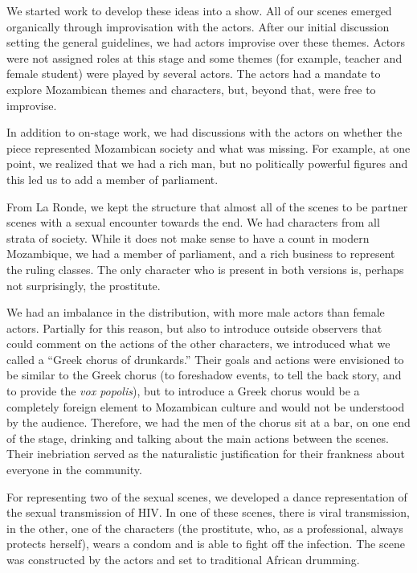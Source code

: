 \documentclass[article,twocolumn,twoside]{memoir}
\begin{document}
We started work to develop these ideas into a show. All of our scenes emerged
organically through improvisation with the actors. After our initial discussion
setting the general guidelines, we had actors improvise over these themes.
Actors were not assigned roles at this stage and some themes (for example,
teacher and female student) were played by several actors. The actors had a
mandate to explore Mozambican themes and characters, but, beyond that, were
free to improvise.

In addition to on-stage work, we had discussions with the actors on whether the
piece represented Mozambican society and what was missing. For example, at one
point, we realized that we had a rich man, but no politically powerful figures
and this led us to add a member of parliament.

From La Ronde, we kept the structure that almost all of the scenes to be
partner scenes with a sexual encounter towards the end. We had characters from
all strata of society. While it does not make sense to have a count in modern
Mozambique, we had a member of parliament, and a rich business to represent the
ruling classes. The only character who is present in both versions is, perhaps
not surprisingly, the prostitute.

We had an imbalance in the distribution, with more male actors than female
actors. Partially for this reason, but also to introduce outside observers that
could comment on the actions of the other characters, we introduced what we
called a ``Greek chorus of drunkards.'' Their goals and actions were envisioned
to be similar to the Greek chorus (to foreshadow events, to tell the back story,
and to provide the \textit{vox popolis}), but to introduce a Greek chorus would
be a completely foreign element to Mozambican culture and would not be
understood by the audience. Therefore, we had the men of the chorus sit at a
bar, on one end of the stage, drinking and talking about the main actions
between the scenes. Their inebriation served as the naturalistic justification
for their frankness about everyone in the community.

For representing two of the sexual scenes, we developed a dance representation
of the sexual transmission of HIV. In one of these scenes, there is viral
transmission, in the other, one of the characters (the prostitute, who, as a
professional, always protects herself), wears a condom and is able to fight off
the infection. The scene was constructed by the actors and set to traditional
African drumming.
\end{document}

